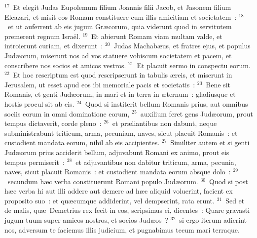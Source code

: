 ${}^{17}$~Et elegit Judas Eupolemum filium Joannis filii Jacob, et Jasonem filium Eleazari, et misit eos Romam constituere cum illis amicitiam et societatem~:
${}^{18}$~et ut auferrent ab eis jugum Gr\ae corum, quia viderunt quod in servitutem premerent regnum Isra\"el.
${}^{19}$~Et abierunt Romam viam multam valde, et introierunt curiam, et dixerunt~:
${}^{20}$~Judas Machab\ae us, et fratres ejus, et populus Jud\ae orum, miserunt nos ad vos statuere vobiscum societatem et pacem, et conscribere nos socios et amicos vestros.
${}^{21}$~Et placuit sermo in conspectu eorum.
${}^{22}$~Et hoc rescriptum est quod rescripserunt in tabulis \ae reis, et miserunt in Jerusalem, ut esset apud eos ibi memoriale pacis et societatis~:
${}^{23}$~Bene sit Romanis, et genti Jud\ae orum, in mari et in terra in \ae ternum~: gladiusque et hostis procul sit ab eis.
${}^{24}$~Quod si institerit bellum Romanis prius, aut omnibus sociis eorum in omni dominatione eorum,
${}^{25}$~auxilium feret gens Jud\ae orum, prout tempus dictaverit, corde pleno~:
${}^{26}$~et pr\ae liantibus non dabunt, neque subministrabunt triticum, arma, pecuniam, naves, sicut placuit Romanis~: et custodient mandata eorum, nihil ab eis accipientes.
${}^{27}$~Similiter autem et si genti Jud\ae orum prius acciderit bellum, adjuvabunt Romani ex animo, prout eis tempus permiserit~:
${}^{28}$~et adjuvantibus non dabitur triticum, arma, pecunia, naves, sicut placuit Romanis~: et custodient mandata eorum absque dolo~:
${}^{29}$~secundum h\ae c verba constituerunt Romani populo Jud\ae orum.
${}^{30}$~Quod si post h\ae c verba hi aut illi addere aut demere ad h\ae c aliquid voluerint, facient ex proposito suo~: et qu\ae cumque addiderint, vel dempserint, rata erunt.
${}^{31}$~Sed et de malis, qu\ae\ Demetrius rex fecit in eos, scripsimus ei, dicentes~: Quare gravasti jugum tuum super amicos nostros, et socios Jud\ae os~?
${}^{32}$~si ergo iterum adierint nos, adversum te faciemus illis judicium, et pugnabimus tecum mari terraque.

